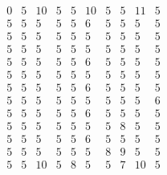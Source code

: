 \documentclass[12pt,oneside,a4paper]{article}
\begin{document}
  \begin{equation}
    \tag{Mean Tabu duration by city table 8}
    \begin{smallmatrix} 0 & 5 & 10 & 5 & 5 & 10 & 5 & 5 & 11 & 5 \\
                    5 & 5 & 5 & 5 & 5 & 6 & 5 & 5 & 5 & 5 \\
                    5 & 5 & 5 & 5 & 5 & 5 & 5 & 5 & 5 & 5\\
                    5 & 5 & 5 & 5 & 5 & 5 & 5 & 5 & 5 & 5 \\
                    5 & 5 & 5 & 5 & 5 & 6 & 5 & 5 & 5 & 5 \\
                    5 & 5 & 5 & 5 & 5 & 5 & 5 & 5 & 5 & 5\\
                    5 & 5 & 5 & 5 & 5 & 6 & 5 & 5 & 5 & 5 \\
                    5 & 5 & 5 & 5 & 5 & 5 & 5 & 5 & 5 & 6\\
                    5 & 5 & 5 & 5 & 5 & 6 & 5 & 5 & 5 & 5 \\
                    5 & 5 & 5 & 5 & 5 & 5 & 5 & 8 & 5 & 5\\
                    5 & 5 & 5 & 5 & 5 & 6 & 5 & 5 & 5 & 5 \\
                    5 & 5 & 5 & 5 & 5 & 5 & 8 & 9 & 5 & 5\\
                    5 & 5 & 10 & 5 & 8 & 5 & 5 & 7 & 10 & 5
    \end{smallmatrix}
  \end{equation}
\end{document}
